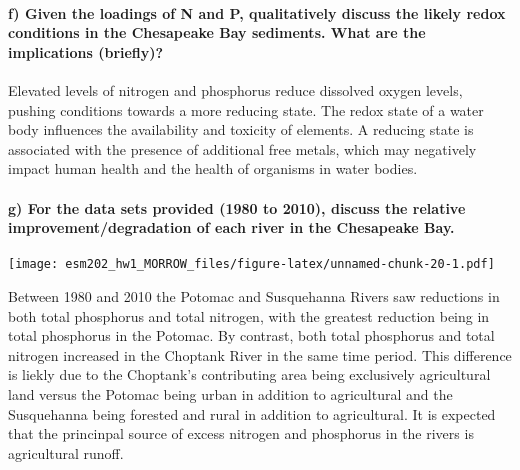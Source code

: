 \documentclass[
]{article}
\let\oldparagraph\paragraph
\renewcommand{\paragraph}[1]{\oldparagraph{#1}\mbox{}}
\begin{document}
\hypertarget{f-given-the-loadings-of-n-and-p-qualitatively-discuss-the-likely-redox-conditions-in-the-chesapeake-bay-sediments.-what-are-the-implications-briefly}{%
\paragraph{f) Given the loadings of N and P, qualitatively discuss the
likely redox conditions in the Chesapeake Bay sediments. What are the
implications
(briefly)?}\label{f-given-the-loadings-of-n-and-p-qualitatively-discuss-the-likely-redox-conditions-in-the-chesapeake-bay-sediments.-what-are-the-implications-briefly}}

Elevated levels of nitrogen and phosphorus reduce dissolved oxygen
levels, pushing conditions towards a more reducing state. The redox
state of a water body influences the availability and toxicity of
elements. A reducing state is associated with the presence of additional
free metals, which may negatively impact human health and the health of
organisms in water bodies.

\hypertarget{g-for-the-data-sets-provided-1980-to-2010-discuss-the-relative-improvementdegradation-of-each-river-in-the-chesapeake-bay.}{%
\paragraph{g) For the data sets provided (1980 to 2010), discuss the
relative improvement/degradation of each river in the Chesapeake
Bay.}\label{g-for-the-data-sets-provided-1980-to-2010-discuss-the-relative-improvementdegradation-of-each-river-in-the-chesapeake-bay.}}

\texttt{[image: esm202\_hw1\_MORROW\_files/figure-latex/unnamed-chunk-20-1.pdf]}

Between 1980 and 2010 the Potomac and Susquehanna Rivers saw reductions
in both total phosphorus and total nitrogen, with the greatest reduction
being in total phosphorus in the Potomac. By contrast, both total
phosphorus and total nitrogen increased in the Choptank River in the
same time period. This difference is liekly due to the Choptank's
contributing area being exclusively agricultural land versus the Potomac
being urban in addition to agricultural and the Susquehanna being
forested and rural in addition to agricultural. It is expected that the
princinpal source of excess nitrogen and phosphorus in the rivers is
agricultural runoff.
\end{document}
